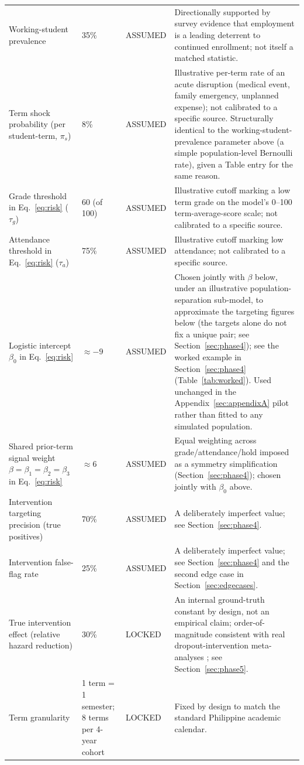 \documentclass[11pt]{article}
\begin{document}
{\begin{longtable}{@{}p{}p{}p{}p{}@{}}
\addlinespace
Working-student prevalence & 35\% & ASSUMED & Directionally supported by survey evidence that employment is a leading deterrent to continued enrollment; not itself a matched statistic. \\
\addlinespace
Term shock probability (per student-term, $\pi_s$) & 8\% & ASSUMED & Illustrative per-term rate of an acute disruption (medical event, family emergency, unplanned expense); not calibrated to a specific source. Structurally identical to the working-student-prevalence parameter above (a simple population-level Bernoulli rate), given a Table entry for the same reason. \\
\addlinespace
Grade threshold in Eq.~\ref{eq:risk} ($\tau_g$) & 60 (of 100) & ASSUMED & Illustrative cutoff marking a low term grade on the model's 0--100 term-average-score scale; not calibrated to a specific source. \\
\addlinespace
Attendance threshold in Eq.~\ref{eq:risk} ($\tau_a$) & 75\% & ASSUMED & Illustrative cutoff marking low attendance; not calibrated to a specific source. \\
\addlinespace
Logistic intercept $\beta_0$ in Eq.~\ref{eq:risk} & $\approx -9$ & ASSUMED & Chosen jointly with $\beta$ below, under an illustrative population-separation sub-model, to approximate the targeting figures below (the targets alone do not fix a unique pair; see Section~\ref{sec:phase4}); see the worked example in Section~\ref{sec:phase4} (Table~\ref{tab:worked}). Used unchanged in the Appendix~\ref{sec:appendixA} pilot rather than fitted to any simulated population. \\
\addlinespace
Shared prior-term signal weight $\beta=\beta_1=\beta_2=\beta_3$ in Eq.~\ref{eq:risk} & $\approx 6$ & ASSUMED & Equal weighting across grade/attendance/hold imposed as a symmetry simplification (Section~\ref{sec:phase4}); chosen jointly with $\beta_0$ above. \\
\addlinespace
Intervention targeting precision (true positives) & 70\% & ASSUMED & A deliberately imperfect value; see Section~\ref{sec:phase4}. \\
\addlinespace
Intervention false-flag rate & 25\% & ASSUMED & A deliberately imperfect value; see Section~\ref{sec:phase4} and the second edge case in Section~\ref{sec:edgecases}. \\
\addlinespace
True intervention effect (relative hazard reduction) & 30\% & LOCKED & An internal ground-truth constant by design, not an empirical claim; order-of-magnitude consistent with real dropout-intervention meta-analyses \citep{wang2024meta}; see Section~\ref{sec:phase5}. \\
\addlinespace
Term granularity & 1 term = 1 semester; 8 terms per 4-year cohort & LOCKED & Fixed by design to match the standard Philippine academic calendar. \\
\end{longtable}
}
\end{document}
